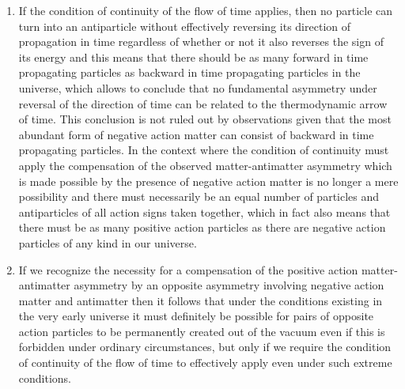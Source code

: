 \documentclass[notitlepage,12pt]{report}
\begin{document}
\begin{enumerate}
\item If the condition of continuity of the flow of time applies, then no particle can turn into an antiparticle without effectively reversing its direction of propagation in time regardless of whether or not it also reverses the sign of its energy and this means that there should be as many forward in time propagating particles as backward in time propagating particles in the universe, which allows to conclude that no fundamental asymmetry under reversal of the direction of time can be related to the thermodynamic arrow of time. This conclusion is not ruled out by observations given that the most abundant form of negative action matter can consist of backward in time propagating particles. In the context where the condition of continuity must apply the compensation of the observed matter-antimatter asymmetry which is made possible by the presence of negative action matter is no longer a mere possibility and there must necessarily be an equal number of particles and antiparticles of all action signs taken together, which in fact also means that there must be as many positive action particles as there are negative action particles of any kind in our universe.

\item If we recognize the necessity for a compensation of the positive action matter-antimatter asymmetry by an opposite asymmetry involving negative action matter and antimatter then it follows that under the conditions existing in the very early universe it must definitely be possible for pairs of opposite action particles to be permanently created out of the vacuum even if this is forbidden under ordinary circumstances, but only if we require the condition of continuity of the flow of time to effectively apply even under such extreme conditions.


\end{enumerate}
\end{document}

